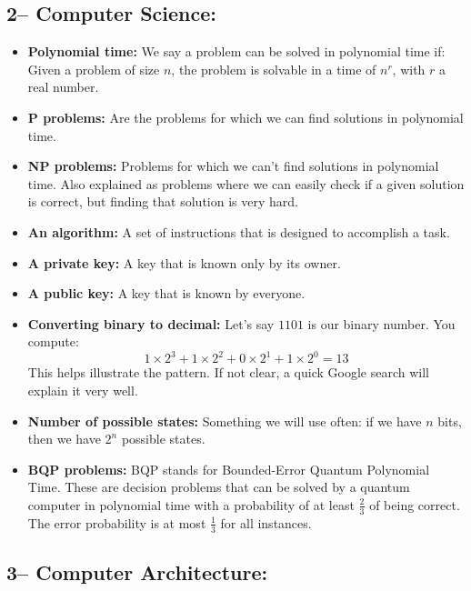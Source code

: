     \subsection*{2– Computer Science:}
\begin{itemize}
    \item \textbf{Polynomial time:} We say a problem can be solved in polynomial time if: Given a problem of size \( n \), the problem is solvable in a time of \( n^r \), with \( r \) a real number.

    \item \textbf{P problems:} Are the problems for which we can find solutions in polynomial time.

    \item \textbf{NP problems:} Problems for which we can’t find solutions in polynomial time. Also explained as problems where we can easily check if a given solution is correct, but finding that solution is very hard.

    \item \textbf{An algorithm:} A set of instructions that is designed to accomplish a task.

    \item \textbf{A private key:} A key that is known only by its owner.

    \item \textbf{A public key:} A key that is known by everyone.

    \item \textbf{Converting binary to decimal:} Let’s say \( 1101 \) is our binary number. You compute:
    \[
    1 \times 2^3 + 1 \times 2^2 + 0 \times 2^1 + 1 \times 2^0 = 13
    \]    
    This helps illustrate the pattern. If not clear, a quick Google search will explain it very well.

    \item \textbf{Number of possible states:} Something we will use often: if we have \( n \) bits, then we have \( 2^n \) possible states.

    \item \textbf{BQP problems:} BQP stands for Bounded-Error Quantum Polynomial Time. These are decision problems that can be solved by a quantum computer in polynomial time with a probability of at least \( \frac{2}{3} \) of being correct. The error probability is at most \( \frac{1}{3} \) for all instances.
\end{itemize}

\subsection*{3– Computer Architecture:}

